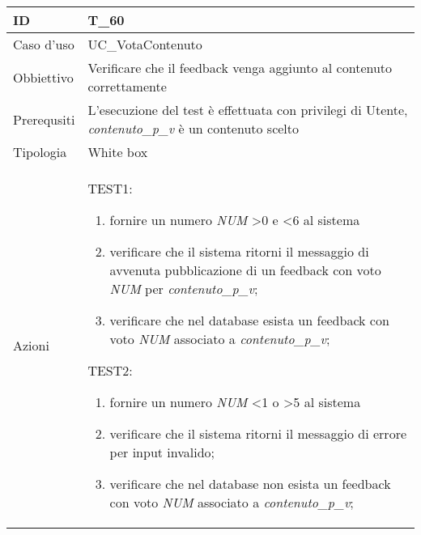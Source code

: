 \begin{table}[hb]
    \centering
    \begin{tabular}{ |p{2cm}|p{10cm}|  }
        \hline
        ID          & T\_60                                                              \\\hline
        Caso d'uso  & UC\_VotaContenuto                                             \\\hline
        Obbiettivo  & Verificare che il feedback venga aggiunto al contenuto correttamente \\\hline
        Prerequsiti & L'esecuzione del test è effettuata con privilegi di Utente, \emph{contenuto\_p\_v} 
        è un contenuto scelto \\\hline
        Tipologia   & White box                                                          \\\hline
        Azioni      &
        TEST1:
        \begin{enumerate}[nosep, topsep=0pt]
            \item fornire un numero \emph{NUM} \textgreater 0 e \textless 6 al sistema
            \item verificare che il sistema ritorni il messaggio di avvenuta pubblicazione 
            di un feedback con voto \emph{NUM} per \emph{contenuto\_p\_v};
            \item verificare che nel database esista un feedback con voto \emph{NUM} associato a 
            \emph{contenuto\_p\_v};
        \end{enumerate}
        \vspace{0.5cm} TEST2:
        \begin{enumerate}[nosep, topsep=0pt]
            \item fornire un numero \emph{NUM} \textless 1 o \textgreater 5 al sistema
            \item verificare che il sistema ritorni il messaggio di errore per input invalido;
            \item verificare che nel database non esista un feedback con voto \emph{NUM} associato a 
            \emph{contenuto\_p\_v};
        \end{enumerate}
        \\\hline
    \end{tabular}
\end{table}

